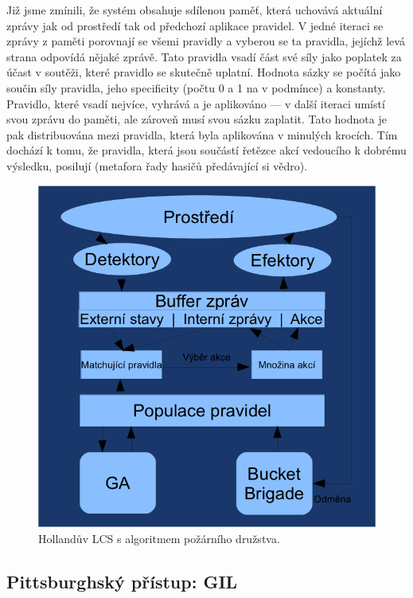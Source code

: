Již jsme zmínili, že systém obsahuje sdílenou paměť, která uchovává aktuální zprávy jak od prostředí tak od předchozí aplikace pravidel. V jedné iteraci se zprávy z paměti porovnají se všemi pravidly a vyberou se ta pravidla, jejíchž levá strana odpovídá nějaké zprávě. Tato pravidla vsadí část své síly jako poplatek za účast v soutěži, které pravidlo se skutečně uplatní. Hodnota sázky se počítá jako součin síly pravidla, jeho specificity (počtu 0 a 1 na v podmínce) a konstanty. Pravidlo, které vsadí nejvíce, vyhrává a je aplikováno --- v další iteraci umístí svou zprávu do paměti, ale zároveň musí svou sázku zaplatit. Tato hodnota je pak distribuována mezi pravidla, která byla aplikována v minulých krocích. Tím dochází k tomu, že pravidla, která jsou součástí řetězce akcí vedoucího k dobrému výsledku, posilují (metafora řady hasičů předávající si vědro).

\begin{figure}
\includegraphics{graphics/bucketbrigade.png}
\caption{Hollandův LCS s algoritmem požárního družstva.}
\end{figure}


\subsection{Pittsburghský přístup: GIL}

